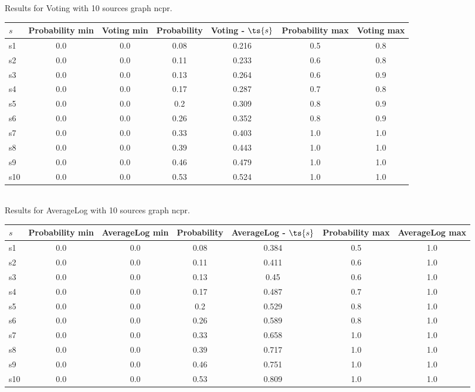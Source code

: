 \documentclass{article}
\begin{document}
\noindent Results for Voting with 10 sources graph ncpr.

\noindent\begin{tabular}{|l|c|c|c|c|c|c|}
\hline
$s$& Probability min & Voting min & Probability & Voting - $\ts{s}$ & Probability max & Voting max\\
\hline
s1 &0.0 & 0.0 & 0.08 & 0.216 & 0.5 & 0.8\\
\hline
s2 &0.0 & 0.0 & 0.11 & 0.233 & 0.6 & 0.8\\
\hline
s3 &0.0 & 0.0 & 0.13 & 0.264 & 0.6 & 0.9\\
\hline
s4 &0.0 & 0.0 & 0.17 & 0.287 & 0.7 & 0.8\\
\hline
s5 &0.0 & 0.0 & 0.2 & 0.309 & 0.8 & 0.9\\
\hline
s6 &0.0 & 0.0 & 0.26 & 0.352 & 0.8 & 0.9\\
\hline
s7 &0.0 & 0.0 & 0.33 & 0.403 & 1.0 & 1.0\\
\hline
s8 &0.0 & 0.0 & 0.39 & 0.443 & 1.0 & 1.0\\
\hline
s9 &0.0 & 0.0 & 0.46 & 0.479 & 1.0 & 1.0\\
\hline
s10 &0.0 & 0.0 & 0.53 & 0.524 & 1.0 & 1.0\\
\hline
\end{tabular}\\

\noindent Results for AverageLog with 10 sources graph ncpr.

\noindent\begin{tabular}{|l|c|c|c|c|c|c|}
\hline
$s$& Probability min & AverageLog min & Probability & AverageLog - $\ts{s}$ & Probability max & AverageLog max\\
\hline
s1 &0.0 & 0.0 & 0.08 & 0.384 & 0.5 & 1.0\\
\hline
s2 &0.0 & 0.0 & 0.11 & 0.411 & 0.6 & 1.0\\
\hline
s3 &0.0 & 0.0 & 0.13 & 0.45 & 0.6 & 1.0\\
\hline
s4 &0.0 & 0.0 & 0.17 & 0.487 & 0.7 & 1.0\\
\hline
s5 &0.0 & 0.0 & 0.2 & 0.529 & 0.8 & 1.0\\
\hline
s6 &0.0 & 0.0 & 0.26 & 0.589 & 0.8 & 1.0\\
\hline
s7 &0.0 & 0.0 & 0.33 & 0.658 & 1.0 & 1.0\\
\hline
s8 &0.0 & 0.0 & 0.39 & 0.717 & 1.0 & 1.0\\
\hline
s9 &0.0 & 0.0 & 0.46 & 0.751 & 1.0 & 1.0\\
\hline
s10 &0.0 & 0.0 & 0.53 & 0.809 & 1.0 & 1.0\\
\hline
\end{tabular}\\
\end{document}
